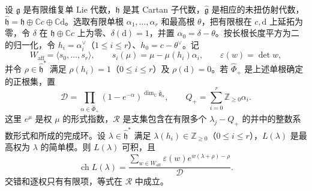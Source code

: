 \begin{theorem}\label{b5:thm:G-weyl-kac}
	设 \(\mathfrak g\) 是有限维复单 Lie 代数，\(\mathfrak h\) 是其 Cartan 子代数，\(\widehat{\mathfrak g}\) 是相应的未扭仿射代数，\(\widehat{\mathfrak h}=\mathfrak h\oplus\mathbb Cc\oplus\mathbb C\mathrm d\)。选取有限单根 \(\alpha_1,\ldots,\alpha_r\) 和最高根 \(\theta\)，把有限根在 \(c,\mathrm d\) 上延拓为零，令 \(\delta\) 在 \(\mathfrak h\oplus\mathbb Cc\) 上为零、\(\delta(\mathrm d)=1\)，并置 \(\alpha_0=\delta-\theta\)。按长根长度平方为二的归一化，令 \(h_i=\alpha_i^\vee\)（\(1\le i\le r\)）、\(h_0=c-\theta^\vee\)。记
	\[
		W_{\mathrm{aff}}=\langle s_0,\ldots,s_r\rangle,
		\qquad s_i(\mu)=\mu-\mu(h_i)\alpha_i,
		\qquad \varepsilon(w)=\det w,
	\]
	并令 \(\rho\in\widehat{\mathfrak h}^*\) 满足 \(\rho(h_i)=1\)（\(0\le i\le r\)）及 \(\rho(\mathrm d)=0\)。若 \(\widehat\Phi_+\) 是上述单根确定的正根集，置
	\[
		\mathcal D=\prod_{\alpha\in\widehat\Phi_+}(1-e^{-\alpha})^{\dim_{\mathbb C}\widehat{\mathfrak g}_\alpha},
		\qquad Q_+=\sum_{i=0}^r\mathbb Z_{\ge0}\alpha_i.
	\]
	这里 \(e^\mu\) 是权 \(\mu\) 的形式指数，\(\mathscr R\) 是支集包含在有限多个 \(\lambda_j-Q_+\) 的并中的整数系数形式和所成的完成环。设 \(\lambda\in\widehat{\mathfrak h}^*\) 满足 \(\lambda(h_i)\in\mathbb Z_{\ge0}\)（\(0\le i\le r\)），\(L(\lambda)\) 是最高权为 \(\lambda\) 的简单模。则 \(L(\lambda)\) 可积，且
	\begin{equation}\label{b5:eq:G-weyl-kac}
		\operatorname{ch}L(\lambda)
		=\frac{\displaystyle\sum_{w\in W_{\mathrm{aff}}}\varepsilon(w)e^{w(\lambda+\rho)-\rho}}{\mathcal D}.
	\end{equation}
	交错和逐权只有有限项，等式在 \(\mathscr R\) 中成立。
\end{theorem}
